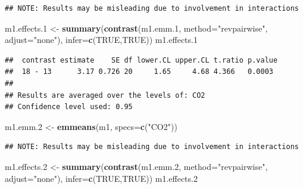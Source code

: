 \documentclass[]{book}
\newenvironment{Shaded}{\begin{snugshade}}{\end{snugshade}}
\newcommand{\DataTypeTok}[1]{\textcolor[rgb]{0.13,0.29,0.53}{#1}}
\newcommand{\FloatTok}[1]{\textcolor[rgb]{0.00,0.00,0.81}{#1}}
\newcommand{\KeywordTok}[1]{\textcolor[rgb]{0.13,0.29,0.53}{\textbf{#1}}}
\newcommand{\NormalTok}[1]{#1}
\newcommand{\OtherTok}[1]{\textcolor[rgb]{0.56,0.35,0.01}{#1}}
\newcommand{\StringTok}[1]{\textcolor[rgb]{0.31,0.60,0.02}{#1}}
\begin{document}
\begin{verbatim}
## NOTE: Results may be misleading due to involvement in interactions
\end{verbatim}

\begin{Shaded}
\begin{Highlighting}[]
\NormalTok{m1.effects}\FloatTok{.1}\NormalTok{ <-}\StringTok{ }\KeywordTok{summary}\NormalTok{(}\KeywordTok{contrast}\NormalTok{(m1.emm}\FloatTok{.1}\NormalTok{,}
                 \DataTypeTok{method=}\StringTok{"revpairwise"}\NormalTok{,}
                 \DataTypeTok{adjust=}\StringTok{"none"}\NormalTok{),}
        \DataTypeTok{infer=}\KeywordTok{c}\NormalTok{(}\OtherTok{TRUE}\NormalTok{,}\OtherTok{TRUE}\NormalTok{))}
\NormalTok{m1.effects}\FloatTok{.1}
\end{Highlighting}
\end{Shaded}

\begin{verbatim}
##  contrast estimate    SE df lower.CL upper.CL t.ratio p.value
##  18 - 13      3.17 0.726 20     1.65     4.68 4.366   0.0003 
## 
## Results are averaged over the levels of: CO2 
## Confidence level used: 0.95
\end{verbatim}

\begin{Shaded}
\begin{Highlighting}[]
\NormalTok{m1.emm}\FloatTok{.2}\NormalTok{ <-}\StringTok{ }\KeywordTok{emmeans}\NormalTok{(m1, }\DataTypeTok{specs=}\KeywordTok{c}\NormalTok{(}\StringTok{"CO2"}\NormalTok{))}
\end{Highlighting}
\end{Shaded}

\begin{verbatim}
## NOTE: Results may be misleading due to involvement in interactions
\end{verbatim}

\begin{Shaded}
\begin{Highlighting}[]
\NormalTok{m1.effects}\FloatTok{.2}\NormalTok{ <-}\StringTok{ }\KeywordTok{summary}\NormalTok{(}\KeywordTok{contrast}\NormalTok{(m1.emm}\FloatTok{.2}\NormalTok{,}
                 \DataTypeTok{method=}\StringTok{"revpairwise"}\NormalTok{,}
                 \DataTypeTok{adjust=}\StringTok{"none"}\NormalTok{),}
        \DataTypeTok{infer=}\KeywordTok{c}\NormalTok{(}\OtherTok{TRUE}\NormalTok{,}\OtherTok{TRUE}\NormalTok{))}
\NormalTok{m1.effects}\FloatTok{.2}
\end{Highlighting}
\end{Shaded}
\end{document}
